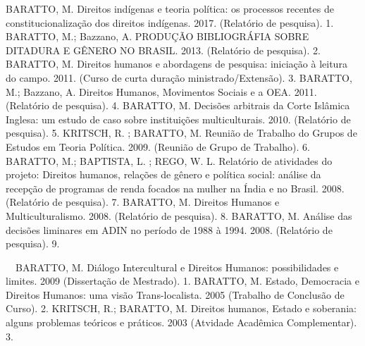 \begin{cvhonors}
  \cvhonor
    {BARATTO, M.}
    {Direitos indígenas e teoria política: os processos recentes de constitucionalização dos direitos indígenas. 2017. (Relatório de pesquisa).}
    {}
    {1. }
  \cvhonor
    {BARATTO, M.; Bazzano, A.}
    {PRODUÇÃO BIBLIOGRÁFIA SOBRE DITADURA E GÊNERO NO BRASIL. 2013. (Relatório de pesquisa).}
    {}
    {2. }
  \cvhonor
    {BARATTO, M.}
    {Direitos humanos e abordagens de pesquisa: iniciação à leitura do campo. 2011. (Curso de curta duração ministrado/Extensão).}
    {}
    {3. }
  \cvhonor
    {BARATTO, M.; Bazzano, A.}
    {Direitos Humanos, Movimentos Sociais e a OEA. 2011. (Relatório de pesquisa).}
    {}
    {4. }
  \cvhonor
    {BARATTO, M.}
    {Decisões arbitrais da Corte Islâmica Inglesa: um estudo de caso sobre instituições multiculturais. 2010. (Relatório de pesquisa).}
    {}
    {5. }
  \cvhonor
    {KRITSCH, R. ; BARATTO, M.}
    {Reunião de Trabalho do Grupos de Estudos em Teoria Política. 2009. (Reunião de Grupo de Trabalho).}
    {}
    {6. }
  \cvhonor
    {BARATTO, M.; BAPTISTA, L. ; REGO, W. L.}
    {Relatório de atividades do projeto: Direitos humanos, relações de gênero e política social: análise da recepção de programas de renda focados na mulher na Índia e no Brasil. 2008. (Relatório de pesquisa).}
    {}
    {7. }
  \cvhonor
    {BARATTO, M.}
    {Direitos Humanos e Multiculturalismo. 2008. (Relatório de pesquisa).}
    {}
    {8. }
  \cvhonor
    {BARATTO, M.}
    {Análise das decisões liminares em ADIN no período de 1988 à 1994. 2008. (Relatório de pesquisa).}
    {}
    {9. }
\end{cvhonors}


\begin{cvhonors}
  \cvhonor
    {\faStar~~BARATTO, M.}
    {Diálogo Intercultural e Direitos Humanos: possibilidades e limites. 2009 (Dissertação de Mestrado).}
    {}
    {1. }
  \cvhonor
    {BARATTO, M.}
    {Estado, Democracia e Direitos Humanos: uma visão Trans-localista. 2005 (Trabalho de Conclusão de Curso).}
    {}
    {2. }
  \cvhonor
    {KRITSCH, R.; BARATTO, M.}
    {Direitos humanos, Estado e soberania: alguns problemas teóricos e práticos. 2003
    (Atvidade Acadêmica Complementar).}
    {}
    {3. }
\end{cvhonors}
